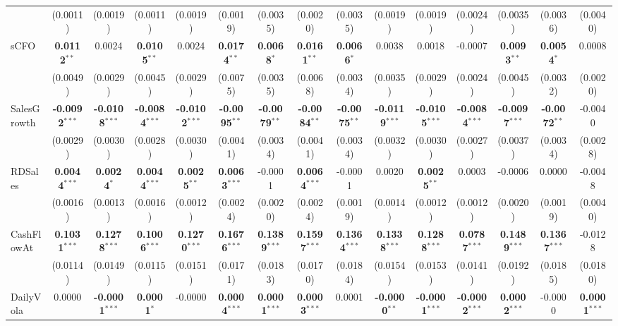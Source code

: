 \begin{landscape}
\begin{table}[H]
\begin{tabular}{lcccccccccccccc}
 & (0.0011) & (0.0019) & (0.0011) & (0.0019) & (0.0019) & (0.0035) & (0.0020) & (0.0035) & (0.0019) & (0.0019) & (0.0024) & (0.0035) & (0.0036) & (0.0040) \\
sCFO & \textbf{0.0112}$^{**}$ & 0.0024 & \textbf{0.0105}$^{**}$ & 0.0024 & \textbf{0.0174}$^{**}$ & \textbf{0.0068}$^{*}$ & \textbf{0.0161}$^{**}$ & \textbf{0.0066}$^{*}$ & 0.0038 & 0.0018 & -0.0007 & \textbf{0.0093}$^{**}$ & \textbf{0.0054}$^{*}$ & 0.0008 \\
 & (0.0049) & (0.0029) & (0.0045) & (0.0029) & (0.0075) & (0.0035) & (0.0068) & (0.0034) & (0.0035) & (0.0029) & (0.0024) & (0.0045) & (0.0032) & (0.0020) \\
SalesGrowth & \textbf{-0.0092}$^{***}$ & \textbf{-0.0108}$^{***}$ & \textbf{-0.0084}$^{***}$ & \textbf{-0.0102}$^{***}$ & \textbf{-0.0095}$^{**}$ & \textbf{-0.0079}$^{**}$ & \textbf{-0.0084}$^{**}$ & \textbf{-0.0075}$^{**}$ & \textbf{-0.0119}$^{***}$ & \textbf{-0.0105}$^{***}$ & \textbf{-0.0084}$^{***}$ & \textbf{-0.0097}$^{***}$ & \textbf{-0.0072}$^{**}$ & -0.0040 \\
 & (0.0029) & (0.0030) & (0.0028) & (0.0030) & (0.0041) & (0.0034) & (0.0041) & (0.0034) & (0.0032) & (0.0030) & (0.0027) & (0.0037) & (0.0034) & (0.0028) \\
RDSales & \textbf{0.0044}$^{***}$ & \textbf{0.0024}$^{*}$ & \textbf{0.0044}$^{***}$ & \textbf{0.0025}$^{**}$ & \textbf{0.0063}$^{***}$ & -0.0001 & \textbf{0.0064}$^{***}$ & -0.0001 & 0.0020 & \textbf{0.0025}$^{**}$ & 0.0003 & -0.0006 & 0.0000 & -0.0048 \\
 & (0.0016) & (0.0013) & (0.0016) & (0.0012) & (0.0024) & (0.0020) & (0.0024) & (0.0019) & (0.0014) & (0.0012) & (0.0012) & (0.0020) & (0.0019) & (0.0040) \\
CashFlowAt & \textbf{0.1031}$^{***}$ & \textbf{0.1278}$^{***}$ & \textbf{0.1006}$^{***}$ & \textbf{0.1270}$^{***}$ & \textbf{0.1676}$^{***}$ & \textbf{0.1389}$^{***}$ & \textbf{0.1597}$^{***}$ & \textbf{0.1364}$^{***}$ & \textbf{0.1338}$^{***}$ & \textbf{0.1288}$^{***}$ & \textbf{0.0787}$^{***}$ & \textbf{0.1489}$^{***}$ & \textbf{0.1367}$^{***}$ & -0.0128 \\
 & (0.0114) & (0.0149) & (0.0115) & (0.0151) & (0.0171) & (0.0183) & (0.0170) & (0.0184) & (0.0154) & (0.0153) & (0.0141) & (0.0192) & (0.0185) & (0.0180) \\
DailyVola & 0.0000 & \textbf{-0.0001}$^{***}$ & \textbf{0.0001}$^{*}$ & -0.0000 & \textbf{0.0004}$^{***}$ & \textbf{0.0001}$^{***}$ & \textbf{0.0003}$^{***}$ & 0.0001 & \textbf{-0.0000}$^{**}$ & \textbf{-0.0001}$^{***}$ & \textbf{-0.0002}$^{***}$ & \textbf{0.0002}$^{***}$ & -0.0000 & \textbf{0.0001}$^{***}$ \\

\end{tabular}
\end{table}
\end{landscape}
